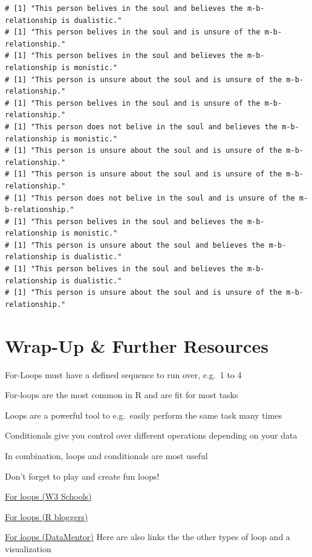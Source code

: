 \documentclass[
]{book}
\begin{document}
\begin{verbatim}
# [1] "This person belives in the soul and believes the m-b-relationship is dualistic."
# [1] "This person belives in the soul and is unsure of the m-b-relationship."
# [1] "This person belives in the soul and believes the m-b-relationship is monistic."
# [1] "This person is unsure about the soul and is unsure of the m-b-relationship."
# [1] "This person belives in the soul and is unsure of the m-b-relationship."
# [1] "This person does not belive in the soul and believes the m-b-relationship is monistic."
# [1] "This person is unsure about the soul and is unsure of the m-b-relationship."
# [1] "This person is unsure about the soul and is unsure of the m-b-relationship."
# [1] "This person does not belive in the soul and is unsure of the m-b-relationship."
# [1] "This person belives in the soul and believes the m-b-relationship is monistic."
# [1] "This person is unsure about the soul and believes the m-b-relationship is dualistic."
# [1] "This person belives in the soul and believes the m-b-relationship is dualistic."
# [1] "This person is unsure about the soul and is unsure of the m-b-relationship."
\end{verbatim}

\section*{Wrap-Up \& Further Resources}\label{wrap-up-further-resources-5}

For-Loops must have a defined sequence to run over, e.g.~1 to 4

For-loops are the most common in R and are fit for most tasks

Loops are a powerful tool to e.g.~easily perform the same task many times

Conditionals give you control over different operations depending on your data

In combination, loops and conditionals are most useful

Don't forget to play and create fun loops!

\href{https://www.w3schools.com/r/r_for_loop.asp/}{For loops (W3 Schools)}

\href{https://www.r-bloggers.com/2015/12/how-to-write-the-first-for-loop-in-r/}{For loops (R bloggers)}

\href{https://www.datamentor.io/r-programming/for-loop}{For loops (DataMentor)} Here are also links the the other types of loop and a visualization
\end{document}
